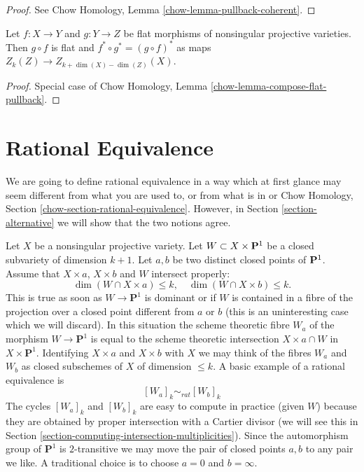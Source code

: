 \begin{proof}
See Chow Homology, Lemma \ref{chow-lemma-pullback-coherent}.
\end{proof}

\begin{lemma}
\label{lemma-compose-flat-pullback}
Let $f : X \to Y$ and $g : Y \to Z$ be flat morphisms of
nonsingular projective varieties. Then $g \circ f$ is flat
and $f^* \circ g^* = (g \circ f)^*$
as maps $Z_k(Z) \to Z_{k + \dim(X) - \dim(Z)}(X)$.
\end{lemma}

\begin{proof}
Special case of Chow Homology, Lemma \ref{chow-lemma-compose-flat-pullback}.
\end{proof}


\section{Rational Equivalence}
\label{section-rational-equivalence}

\noindent
We are going to define rational equivalence in a way which at first
glance may seem different from what you are used to, or from what
is in \cite[Chapter I]{F} or
Chow Homology, Section \ref{chow-section-rational-equivalence}.
However, in Section \ref{section-alternative} we will show that
the two notions agree.

\medskip\noindent
Let $X$ be a nonsingular projective variety. Let $W \subset X \times {\bf P}^1$
be a closed subvariety of dimension $k + 1$. Let $a, b$ be two distinct closed
points of ${\bf P}^1$. Assume that $X \times a$, $X \times b$ and $W$
intersect properly:
$$
\dim (W \cap X \times a) \leq k,\quad
\dim (W \cap X \times b) \leq k.
$$
This is true as soon as $W \to \mathbf{P}^1$ is dominant or if $W$ is
contained in a fibre of the projection over a closed point different from
$a$ or $b$ (this is an uninteresting case which we will discard). In this
situation the scheme theoretic fibre $W_a$ of the morphism
$W \to \mathbf{P}^1$ is equal to the scheme theoretic intersection
$X \times a \cap W$ in $X \times \mathbf{P}^1$. Identifying $X \times a$
and $X \times b$ with $X$ we may think of the fibres $W_a$ and $W_b$
as closed subschemes of $X$ of dimension $\leq k$. A basic example of a
rational equivalence is
$$
[W_a]_k \sim_{rat} [W_b]_k
$$
The cycles $[W_a]_k$ and $[W_b]_k$ are easy to compute in practice
(given $W$) because they are obtained by proper intersection with
a Cartier divisor (we will see this in
Section \ref{section-computing-intersection-multiplicities}).
Since the automorphism group of $\mathbf{P}^1$ is $2$-transitive we may
move the pair of closed points $a, b$ to any pair we like. A traditional
choice is to choose $a = 0$ and $b = \infty$.


